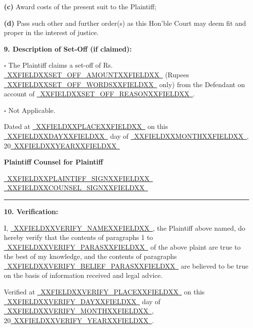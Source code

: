 \documentclass[12pt, a4paper]{article}
\newcommand{\fillline}[1]{\underline{~#1~}}
\begin{document}
\vspace{6pt}
\noindent \textbf{(c)} Award costs of the present suit to the Plaintiff;

\vspace{6pt}
\noindent \textbf{(d)} Pass such other and further order(s) as this Hon'ble Court may deem fit and proper in the interest of justice.

\vspace{8pt}
\noindent \textbf{9. Description of Set-Off (if claimed):}

\noindent $\square$ \; The Plaintiff claims a set-off of Rs. \fillline{XXFIELDXXSET_OFF_AMOUNTXXFIELDXX} (Rupees \fillline{XXFIELDXXSET_OFF_WORDSXXFIELDXX} only) from the Defendant on account of \fillline{XXFIELDXXSET_OFF_REASONXXFIELDXX}.

\noindent $\square$ \; Not Applicable.

\vspace{14pt}
\noindent Dated at \fillline{XXFIELDXXPLACEXXFIELDXX} on this \fillline{XXFIELDXXDAYXXFIELDXX} day of \fillline{XXFIELDXXMONTHXXFIELDXX}, 20\fillline{XXFIELDXXYEARXXFIELDXX}

\vspace{20pt}
\noindent\hfill \textbf{Plaintiff} \hspace{3cm} \textbf{Counsel for Plaintiff}

\noindent\hfill \fillline{XXFIELDXXPLAINTIFF_SIGNXXFIELDXX} \hspace{1.5cm} \fillline{XXFIELDXXCOUNSEL_SIGNXXFIELDXX}

\vspace{16pt}
\noindent\rule{\textwidth}{0.4pt}

\vspace{8pt}
\noindent \textbf{10. Verification:}

\noindent I, \fillline{XXFIELDXXVERIFY_NAMEXXFIELDXX}, the Plaintiff above named, do hereby verify that the contents of paragraphs 1 to \fillline{XXFIELDXXVERIFY_PARASXXFIELDXX} of the above plaint are true to the best of my knowledge, and the contents of paragraphs \fillline{XXFIELDXXVERIFY_BELIEF_PARASXXFIELDXX} are believed to be true on the basis of information received and legal advice.

\vspace{10pt}
\noindent Verified at \fillline{XXFIELDXXVERIFY_PLACEXXFIELDXX} on this \fillline{XXFIELDXXVERIFY_DAYXXFIELDXX} day of \fillline{XXFIELDXXVERIFY_MONTHXXFIELDXX}, 20\fillline{XXFIELDXXVERIFY_YEARXXFIELDXX}.
\end{document}
